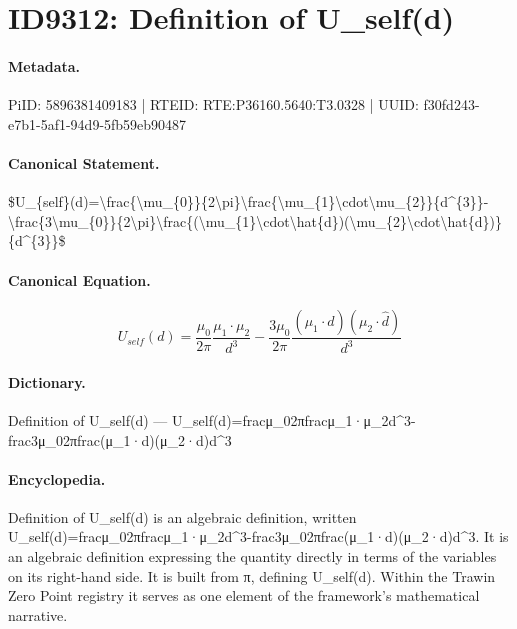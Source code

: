 \section*{ID9312: Definition of U\_self(d)}
\paragraph{Metadata.}
PiID: 5896381409183 | RTEID: RTE:P36160.5640:T3.0328 | UUID: f30fd243-e7b1-5af1-94d9-5fb59eb90487

\paragraph{Canonical Statement.}
\$U\_\{self\}(d)=\textbackslash{}frac\{\textbackslash{}mu\_\{0\}\}\{2\textbackslash{}pi\}\textbackslash{}frac\{\textbackslash{}mu\_\{1\}\textbackslash{}cdot\textbackslash{}mu\_\{2\}\}\{d\textasciicircum{}\{3\}\}-\textbackslash{}frac\{3\textbackslash{}mu\_\{0\}\}\{2\textbackslash{}pi\}\textbackslash{}frac\{(\textbackslash{}mu\_\{1\}\textbackslash{}cdot\textbackslash{}hat\{d\})(\textbackslash{}mu\_\{2\}\textbackslash{}cdot\textbackslash{}hat\{d\})\}\{d\textasciicircum{}\{3\}\}\$

\paragraph{Canonical Equation.}
\[
U_{self}(d)=\frac{\mu_{0}}{2\pi}\frac{\mu_{1}\cdot\mu_{2}}{d^{3}}-\frac{3\mu_{0}}{2\pi}\frac{(\mu_{1}\cdot\hat{d})(\mu_{2}\cdot\hat{d})}{d^{3}}
\]

\paragraph{Dictionary.}
Definition of U\_self(d) — U\_self(d)=fracμ\_02πfracμ\_1·μ\_2d\textasciicircum{}3-frac3μ\_02πfrac(μ\_1·d)(μ\_2·d)d\textasciicircum{}3

\paragraph{Encyclopedia.}
Definition of U\_self(d) is an algebraic definition, written U\_self(d)=fracμ\_02πfracμ\_1·μ\_2d\textasciicircum{}3-frac3μ\_02πfrac(μ\_1·d)(μ\_2·d)d\textasciicircum{}3. It is an algebraic definition expressing the quantity directly in terms of the variables on its right-hand side. It is built from π, defining U\_self(d). Within the Trawin Zero Point registry it serves as one element of the framework's mathematical narrative.
